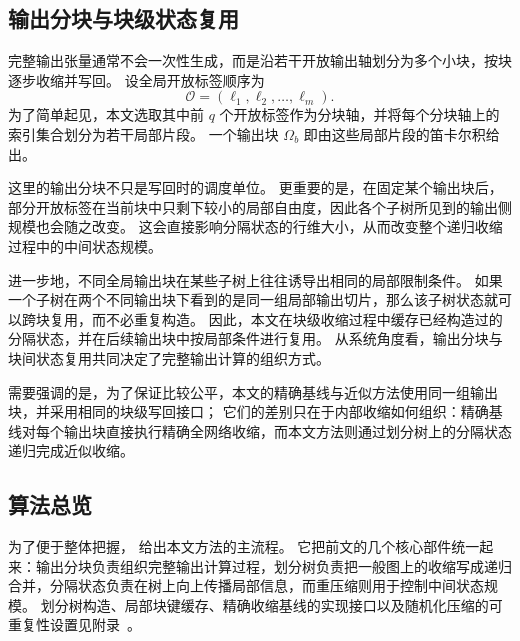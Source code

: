 \subsection{输出分块与块级状态复用}
完整输出张量通常不会一次性生成，而是沿若干开放输出轴划分为多个小块，按块逐步收缩并写回。
设全局开放标签顺序为
\[
\mathcal O = (\ell_1,\ell_2,\ldots,\ell_m).
\]
为了简单起见，本文选取其中前 $q$ 个开放标签作为分块轴，并将每个分块轴上的索引集合划分为若干局部片段。
一个输出块 $\Omega_b$ 即由这些局部片段的笛卡尔积给出。

这里的输出分块不只是写回时的调度单位。
更重要的是，在固定某个输出块后，部分开放标签在当前块中只剩下较小的局部自由度，因此各个子树所见到的输出侧规模也会随之改变。
这会直接影响分隔状态的行维大小，从而改变整个递归收缩过程中的中间状态规模。

进一步地，不同全局输出块在某些子树上往往诱导出相同的局部限制条件。
如果一个子树在两个不同输出块下看到的是同一组局部输出切片，那么该子树状态就可以跨块复用，而不必重复构造。
因此，本文在块级收缩过程中缓存已经构造过的分隔状态，并在后续输出块中按局部条件进行复用。
从系统角度看，输出分块与块间状态复用共同决定了完整输出计算的组织方式。

需要强调的是，为了保证比较公平，本文的精确基线与近似方法使用同一组输出块，并采用相同的块级写回接口；
它们的差别只在于内部收缩如何组织：精确基线对每个输出块直接执行精确全网络收缩，而本文方法则通过划分树上的分隔状态递归完成近似收缩。

\subsection{算法总览}
为了便于整体把握， 给出本文方法的主流程。
它把前文的几个核心部件统一起来：输出分块负责组织完整输出计算过程，划分树负责把一般图上的收缩写成递归合并，分隔状态负责在树上向上传播局部信息，而重压缩则用于控制中间状态规模。
划分树构造、局部块键缓存、精确收缩基线的实现接口以及随机化压缩的可重复性设置见附录~。

